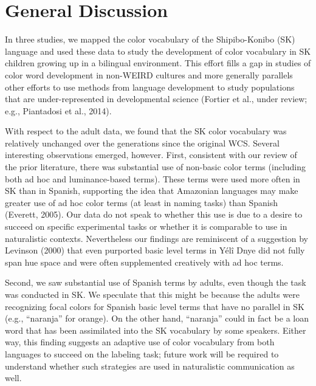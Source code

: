 \documentclass[
  english,
  ,apa7,floatsintext]{apa6}
\begin{document}
\hypertarget{general-discussion}{%
\section{General Discussion}\label{general-discussion}}

In three studies, we mapped the color vocabulary of the Shipibo-Konibo (SK) language and used these data to study the development of color vocabulary in SK children growing up in a bilingual environment. This effort fills a gap in studies of color word development in non-WEIRD cultures and more generally parallels other efforts to use methods from language development to study populations that are under-represented in developmental science (Fortier et al., under review; e.g., Piantadosi et al., 2014).

With respect to the adult data, we found that the SK color vocabulary was relatively unchanged over the generations since the original WCS. Several interesting observations emerged, however. First, consistent with our review of the prior literature, there was substantial use of non-basic color terms (including both ad hoc and luminance-based terms). These terms were used more often in SK than in Spanish, supporting the idea that Amazonian languages may make greater use of ad hoc color terms (at least in naming tasks) than Spanish (Everett, 2005). Our data do not speak to whether this use is due to a desire to succeed on specific experimental tasks or whether it is comparable to use in naturalistic contexts. Nevertheless our findings are reminiscent of a suggestion by Levinson (2000) that even purported basic level terms in Yélî Dnye did not fully span hue space and were often supplemented creatively with ad hoc terms.

Second, we saw substantial use of Spanish terms by adults, even though the task was conducted in SK. We speculate that this might be because the adults were recognizing focal colors for Spanish basic level terms that have no parallel in SK (e.g., ``naranja'' for orange). On the other hand, ``naranja'' could in fact be a loan word that has been assimilated into the SK vocabulary by some speakers. Either way, this finding suggests an adaptive use of color vocabulary from both languages to succeed on the labeling task; future work will be required to understand whether such strategies are used in naturalistic communication as well.
\end{document}
